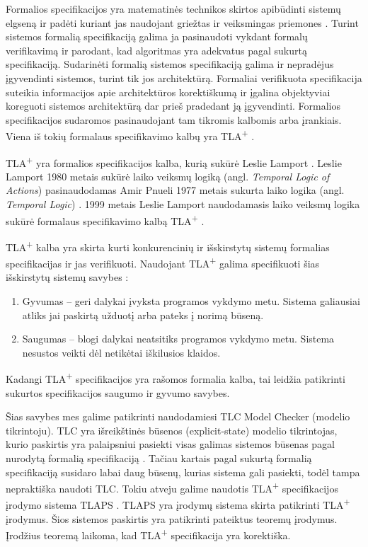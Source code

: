 \documentclass{VUMIFPSmagistrinis}
\begin{document}
        Formalios specifikacijos yra matematinės technikos skirtos apibūdinti sistemų elgseną ir padėti kuriant jas naudojant griežtas ir veiksmingas priemones \cite{holzmann1995improvement}.
		Turint sistemos formalią specifikaciją galima ja pasinaudoti vykdant formalų verifikavimą ir parodant, kad algoritmas yra adekvatus pagal sukurtą specifikaciją.
		Sudarinėti formalią sistemos specifikaciją galima ir nepradėjus įgyvendinti sistemos, turint tik jos architektūrą. 
		Formaliai verifikuota specifikacija suteikia informacijos apie architektūros korektiškumą ir įgalina objektyviai koreguoti sistemos architektūrą dar prieš pradedant ją įgyvendinti.
		Formalios specifikacijos sudaromos pasinaudojant tam tikromis kalbomis arba įrankiais.
		Viena iš tokių formalaus specifikavimo kalbų yra TLA\textsuperscript{+} \cite{lamport2002specifying}.
		

		TLA\textsuperscript{+} yra formalios specifikacijos kalba, kurią sukūrė Leslie Lamport \cite{lamport2002specifying}.
		Leslie Lamport 1980 metais sukūrė laiko veiksmų logiką (angl. {\it Temporal Logic of Actions}) \cite{10.1145/177492.177726} pasinaudodamas Amir Pnueli 1977 metais sukurta laiko logika (angl. {\it Temporal Logic}) \cite{4567924}.
		1999 metais Leslie Lamport naudodamasis laiko veiksmų logika sukūrė formalaus specifikavimo kalbą TLA\textsuperscript{+} \cite{lamport2002specifying}.
		

        TLA\textsuperscript{+} kalba yra skirta kurti konkurencinių ir išskirstytų sistemų formalias specifikacijas ir jas verifikuoti.
		Naudojant TLA\textsuperscript{+} galima specifikuoti šias išskirstytų sistemų savybes \cite{lamport2019safety}:
		\begin{enumerate}
			\item{Gyvumas -- geri dalykai įvyksta programos vykdymo metu. Sistema galiausiai atliks jai paskirtą užduotį arba pateks į norimą būseną.}
			\item{Saugumas -- blogi dalykai neatsitiks programos vykdymo metu. Sistema nesustos veikti dėl netikėtai iškilusios klaidos.}
		\end{enumerate}
		Kadangi TLA\textsuperscript{+} specifikacijos yra rašomos formalia kalba, tai leidžia patikrinti sukurtos specifikacijos saugumo ir gyvumo savybes.

	Šias savybes mes galime patikrinti naudodamiesi TLC Model Checker (modelio tikrintoju).
		TLC yra išreikštinės būsenos (explicit-state) modelio tikrintojas, kurio paskirtis yra palaipsniui pasiekti visas galimas sistemos būsenas pagal nurodytą formalią specifikaciją \cite{yu1999model}.
		Tačiau kartais pagal sukurtą formalią specifikaciją susidaro labai daug būsenų, kurias sistema gali pasiekti, todėl tampa nepraktiška naudoti TLC.
		Tokiu atveju galime naudotis TLA\textsuperscript{+} specifikacijos įrodymo sistema TLAPS \cite{cousineau2012tla+}.
		TLAPS yra įrodymų sistema skirta patikrinti TLA\textsuperscript{+} įrodymus.
		Šios sistemos paskirtis yra patikrinti pateiktus teoremų įrodymus.
		Įrodžius teoremą laikoma, kad TLA\textsuperscript{+} specifikacija yra korektiška.
\end{document}
